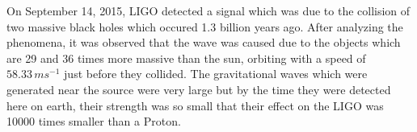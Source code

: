 On September 14, 2015, LIGO detected a signal which was due to the collision of two massive black holes which occured 1.3 billion years ago. After analyzing the phenomena, it was observed that the wave was caused due to the objects which are 29 and 36 times more massive than the sun, orbiting with a speed of $58.33\,ms^{-1}$ just before they collided. The gravitational waves which were generated near the source were very large but by the time they were detected here on earth, their strength was so small that their effect on the LIGO was 10000 times smaller than a Proton.

\pagebreak

